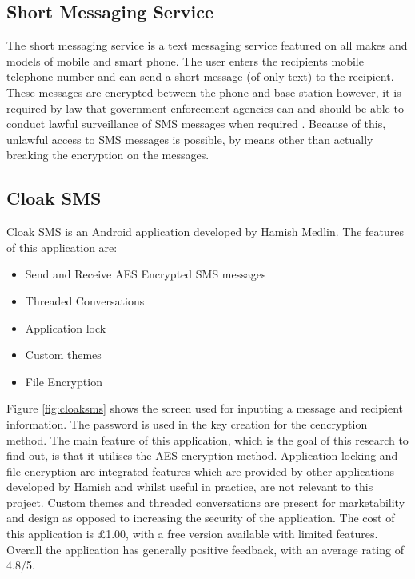 \documentclass[a4paper,10pt]{report}
\begin{document}
\subsection{Short Messaging Service}

The short messaging service is a text messaging service featured on all makes and models of mobile and smart phone. The user enters the recipients mobile telephone number and can send a short message (of only text) to the recipient. These messages are encrypted between the phone and base station however, it is required by law that government enforcement agencies can and should be able to conduct lawful surveillance of SMS messages when required \cite{aresmssafe}. Because of this, unlawful access to SMS messages is possible, by means other than actually breaking the encryption on the messages.

\subsection{Cloak SMS}

Cloak SMS \cite{cloaksms} is an Android application developed by Hamish Medlin. The features of this application are: 

\begin{itemize}
 \item Send and Receive AES Encrypted SMS messages
 \item Threaded Conversations
 \item Application lock
 \item Custom themes
 \item File Encryption
\end{itemize}

Figure \ref{fig:cloaksms} shows the screen used for inputting a message and recipient information. The password is used in the key creation for the cencryption method. The main feature of this application, which is the goal of this research to find out, is that it utilises the AES encryption method. Application locking and file encryption are integrated features which are provided by other applications developed by Hamish and whilst useful in practice, are not relevant to this project. Custom themes and threaded conversations are present for marketability and design as opposed to increasing the security of the application. The cost of this application is £1.00, with a free version available with limited features. Overall the application has generally positive feedback, with an average rating of 4.8/5.
\end{document}
